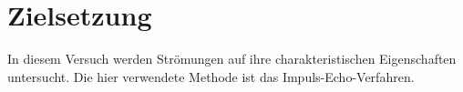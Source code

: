\section{Zielsetzung}
\label{sec:Zielsetzung}

In diesem Versuch werden Strömungen auf ihre charakteristischen Eigenschaften untersucht. Die hier verwendete Methode ist das Impuls-Echo-Verfahren.
